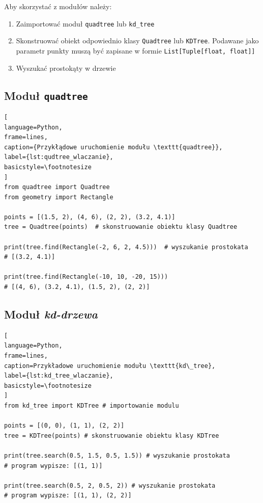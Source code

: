 \documentclass{article}
\begin{document}
Aby skorzystać z modułów należy:
\begin{enumerate}
    \item Zaimportować moduł \texttt{quadtree} lub \texttt{kd\_tree}
    \item Skonstruować obiekt odpowiednio klasy \texttt{Quadtree} lub \texttt{KDTree}. Podawane jako parametr punkty muszą być zapisane w formie \texttt{List[Tuple[float, float]]}
    \item Wyszukać prostokąty w drzewie
\end{enumerate}

\subsection{Moduł \texttt{quadtree}}
\begin{lstlisting}[
language=Python,
frame=lines,
caption={Przykłądowe uruchomienie modułu \texttt{quadtree}},
label={lst:qudtree_wlaczanie},
basicstyle=\footnotesize
]
from quadtree import Quadtree
from geometry import Rectangle

points = [(1.5, 2), (4, 6), (2, 2), (3.2, 4.1)]
tree = Quadtree(points)  # skonstruowanie obiektu klasy Quadtree

print(tree.find(Rectangle(-2, 6, 2, 4.5)))  # wyszukanie prostokata
# [(3.2, 4.1)]

print(tree.find(Rectangle(-10, 10, -20, 15)))
# [(4, 6), (3.2, 4.1), (1.5, 2), (2, 2)]
\end{lstlisting}



\subsection{Moduł \textit{kd-drzewa}}

\begin{lstlisting}[
language=Python,
frame=lines,
caption=Przykładowe uruchomienie modułu \texttt{kd\_tree},
label={lst:kd_tree_wlaczanie},
basicstyle=\footnotesize
]
from kd_tree import KDTree # importowanie modulu

points = [(0, 0), (1, 1), (2, 2)]
tree = KDTree(points) # skonstruowanie obiektu klasy KDTree

print(tree.search(0.5, 1.5, 0.5, 1.5)) # wyszukanie prostokata
# program wypisze: [(1, 1)]

print(tree.search(0.5, 2, 0.5, 2)) # wyszukanie prostokata
# program wypisze: [(1, 1), (2, 2)]
\end{lstlisting}
\end{document}
